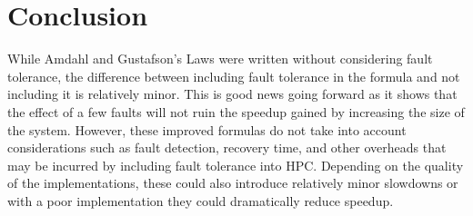 \documentclass[]{article}
\begin{document}
\section{Conclusion}
\label{sect:conclusion}

While Amdahl and Gustafson's Laws were written without considering fault tolerance, the difference between including fault tolerance in the formula and not including it is relatively minor. This is good news going forward as it shows that the effect of a few faults will not ruin the speedup gained by increasing the size of the system. However, these improved formulas do not take into account considerations such as fault detection, recovery time, and other overheads that may be incurred by including fault tolerance into HPC. Depending on the quality of the implementations, these could also introduce relatively minor slowdowns or with a poor implementation they could dramatically reduce speedup.



\end{document}
